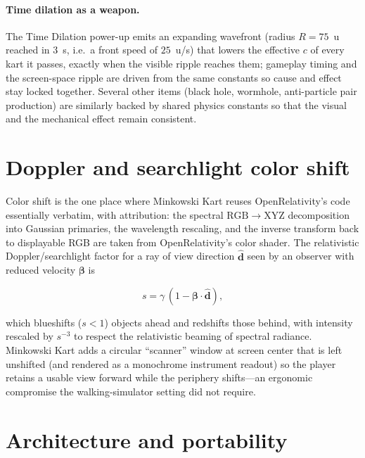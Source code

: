 \documentclass[aip,amsmath,amssymb,reprint,nofootinbib]{revtex4-2}
\begin{document}
\paragraph{Time dilation as a weapon.}
The Time Dilation power-up emits an expanding wavefront (radius
$R = 75$~u reached in $3$~s, i.e.\ a front speed of
$25$~u/s) that lowers the effective $c$ of every kart it passes,
exactly when the visible ripple reaches them; gameplay timing and the
screen-space ripple are driven from the same constants so cause and effect stay
locked together. Several other items (black hole, wormhole, anti-particle pair
production) are similarly backed by shared physics constants so that the visual
and the mechanical effect remain consistent.

\section{Doppler and searchlight color shift}\label{sec:doppler}

Color shift is the one place where Minkowski Kart reuses OpenRelativity's code
essentially verbatim, with attribution: the spectral
$\mathrm{RGB}\!\to\!\mathrm{XYZ}$ decomposition into Gaussian primaries, the
wavelength rescaling, and the inverse transform back to displayable RGB are taken
from OpenRelativity's color shader.\cite{Sherin2016,OpenRelativityRepo} The
relativistic Doppler/searchlight factor for a ray of view direction
$\hat{\bm{d}}$ seen by an observer with reduced velocity $\bm{\beta}$ is

\begin{equation}
s = \gamma\,(1 - \bm{\beta}\!\cdot\!\hat{\bm{d}}),
\label{eq:doppler}
\end{equation}

which blueshifts ($s<1$) objects ahead and redshifts those behind, with intensity
rescaled by $s^{-3}$ to respect the relativistic beaming of spectral radiance.
Minkowski Kart adds a circular ``scanner'' window at screen center that is left
unshifted (and rendered as a monochrome instrument readout) so the player retains
a usable view forward while the periphery shifts---an ergonomic compromise the
walking-simulator setting did not require.

\section{Architecture and portability}\label{sec:arch}
\end{document}
